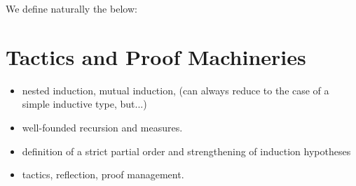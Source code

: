 We define naturally the below:


\section{Tactics and Proof Machineries}
\begin{itemize}
  \item nested induction, mutual induction, (can always reduce to the case of a
  simple inductive type, but...)
  \item well-founded recursion and measures.
  \item definition of a strict partial order and strengthening of induction
  hypotheses 
  \item tactics, reflection, proof management.
\end{itemize}
